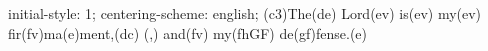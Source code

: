 initial-style: 1;
centering-scheme: english;
(c3)The(de) Lord(ev) is(ev) my(ev) fir(fv)ma(e)ment,(dc) (,) and(fv) my(fhGF) de(gf)fense.(e)
